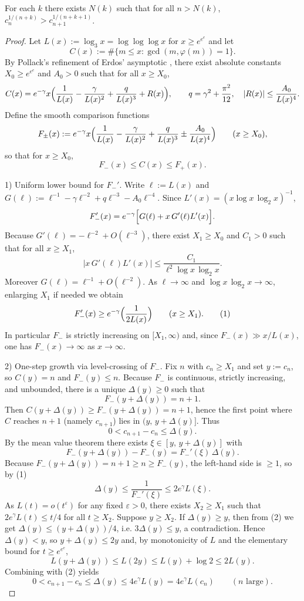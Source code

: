 \begin{theorem}\label{thm:firoozbakht_cyclics_3}
For each \(k\) there exists \(N(k)\) such that for all \(n>N(k)\), \(c_n^{1/(n+k)}>c_{n+1}^{1/(n+k+1)}\).
\end{theorem}

\begin{proof}
Let $L(x):=\log_3 x=\log\log\log x$ for $x\ge e^{e^e}$ and let
$$C(x):=\#\{m\le x: \gcd(m,\varphi(m))=1\}.$$
By Pollack's refinement of Erdos' asymptotic \cite{Pollack2022}, there exist absolute constants $X_0\ge e^{e^e}$ and $A_0>0$ such that for all $x\ge X_0$,
$$
C(x)=e^{-\gamma}x\Bigl(\frac1{L(x)}-\frac{\gamma}{L(x)^2}+\frac{q}{L(x)^3}+R(x)\Bigr),\qquad q=\gamma^2+\frac{\pi^2}{12},\quad |R(x)|\le \frac{A_0}{L(x)^4}.
$$
Define the smooth comparison functions
$$
F_\pm(x):=e^{-\gamma}x\Bigl(\frac1{L(x)}-\frac{\gamma}{L(x)^2}+\frac{q}{L(x)^3}\pm\frac{A_0}{L(x)^4}\Bigr)\qquad(x\ge X_0),
$$
so that for $x\ge X_0$,
$$
F_-(x)\le C(x)\le F_+(x).
$$

1) Uniform lower bound for $F_-'$. Write $\ell:=L(x)$ and $G(\ell):=\ell^{-1}-\gamma\ell^{-2}+q\ell^{-3}-A_0\ell^{-4}$. Since $L'(x)=(x\log x\,\log_2 x)^{-1}$,
$$
F_-'(x)=e^{-\gamma}\Bigl[G(\ell)+x\,G'(\ell)L'(x)\Bigr].
$$
Because $G'(\ell)=-\ell^{-2}+O(\ell^{-3})$, there exist $X_1\ge X_0$ and $C_1>0$ such that for all $x\ge X_1$,
$$
\bigl|x\,G'(\ell)L'(x)\bigr|\le \frac{C_1}{\ell^2\log x\,\log_2 x}.
$$
Moreover $G(\ell)=\ell^{-1}+O(\ell^{-2})$. As $\ell\to\infty$ and $\log x\,\log_2 x\to\infty$, enlarging $X_1$ if needed we obtain
$$
F_-'(x)\ge e^{-\gamma}\Bigl(\frac{1}{2L(x)}\Bigr)\qquad(x\ge X_1).\tag{1}
$$
In particular $F_-$ is strictly increasing on $[X_1,\infty)$ and, since $F_-(x)\gg x/L(x)$, one has $F_-(x)\to\infty$ as $x\to\infty$.

2) One-step growth via level-crossing of $F_-$. Fix $n$ with $c_n\ge X_1$ and set $y:=c_n$, so $C(y)=n$ and $F_-(y)\le n$. Because $F_-$ is continuous, strictly increasing, and unbounded, there is a unique $\Delta(y)\ge0$ such that
$$
F_-(y+\Delta(y))=n+1.
$$
Then $C(y+\Delta(y))\ge F_-(y+\Delta(y))=n+1$, hence the first point where $C$ reaches $n+1$ (namely $c_{n+1}$) lies in $(y,\,y+\Delta(y)]$. Thus
$$
0<c_{n+1}-c_n\le \Delta(y).
$$
By the mean value theorem there exists $\xi\in[y,\,y+\Delta(y)]$ with
$$
F_-(y+\Delta(y)) - F_-(y)=F_-'(\xi)\,\Delta(y).
$$
Because $F_-(y+\Delta(y))=n+1\ge n\ge F_-(y)$, the left-hand side is $\ge1$, so by (1)
$$
\Delta(y)\le \frac{1}{F_-'(\xi)}\le 2e^{\gamma}L(\xi).\tag{2}
$$
As $L(t)=o(t^{\varepsilon})$ for any fixed $\varepsilon>0$, there exists $X_2\ge X_1$ such that $2e^{\gamma}L(t)\le t/4$ for all $t\ge X_2$. Suppose $y\ge X_2$. If $\Delta(y)\ge y$, then from (2) we get $\Delta(y)\le(y+\Delta(y))/4$, i.e. $3\Delta(y)\le y$, a contradiction. Hence $\Delta(y)<y$, so $y+\Delta(y)\le2y$ and, by monotonicity of $L$ and the elementary bound for $t\ge e^{e^e}$,
$$
L(y+\Delta(y))\le L(2y)\le L(y)+\log 2\le 2L(y).
$$
Combining with (2) yields
$$
0<c_{n+1}-c_n\le\Delta(y)\le 4e^{\gamma}L(y)=4e^{\gamma}L(c_n)\qquad(n\text{ large}).\tag{3}
$$


\end{proof}
